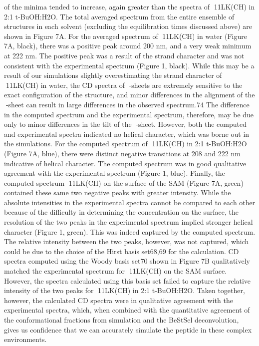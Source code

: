 of the minima tended to increase, again greater than the spectra of 11LK(CH) in 2:1 t-BuOH:H2O.
The total averaged spectrum from the entire ensemble of structures in each solvent (excluding the equilibration times discussed above) are shown in Figure 7A. For the averaged spectrum of 11LK(CH) in water (Figure 7A, black), there was a positive peak around 200 nm, and a very weak minimum at 222 nm. The positive peak was a result of the strand character and was not consistent with the experimental spectrum (Figure 1, black). While this may be a result of our simulations slightly overestimating the strand character of 11LK(CH) in water, the CD spectra of -sheets are extremely sensitive to the exact configuration of the structure, and minor differences in the alignment of the -sheet can result in large differences in the observed spectrum.74 The difference in the computed spectrum and the experimental spectrum, therefore, may be due only to minor differences in the tilt of the -sheet. However, both the computed and experimental spectra indicated no helical character, which was borne out in the simulations. For the computed spectrum of 11LK(CH) in 2:1 t-BuOH:H2O (Figure 7A, blue), there were distinct negative transitions at 208 and 222 nm indicative of helical character. The computed spectrum was in good qualitative agreement with the experimental spectrum (Figure 1, blue). Finally, the computed spectrum 11LK(CH) on the surface of the SAM (Figure 7A, green) contained these same two negative peaks with greater intensity. While the absolute intensities in the experimental spectra cannot be compared to each other because of the difficulty in determining the concentration on the surface, the resolution of the two peaks in the experimental spectrum implied stronger helical character (Figure 1, green). This was indeed captured by the computed spectrum. The relative intensity between the two peaks, however, was not captured, which could be due to the choice of the Hirst basis set68,69 for the calculation. CD spectra computed using the Woody basis set70 shown in Figure 7B qualitatively matched the experimental spectrum for 11LK(CH) on the SAM surface. However, the spectra calculated using this basis set failed to capture the relative intensity of the two peaks for 11LK(CH) in 2:1 t-BuOH:H2O. Taken together, however, the calculated CD spectra were in qualitative agreement with the experimental spectra, which, when combined with the quantitative agreement of the conformational fractions from simulation and the BeStSel deconvolution, gives us confidence that we can accurately simulate the peptide in these complex environments.


